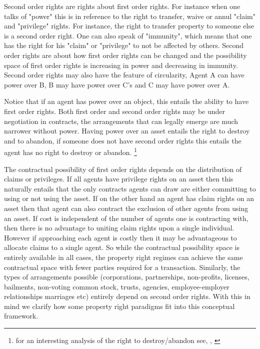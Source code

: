 \documentclass[12pt]{article}
\numberwithin{equation}{section}
\begin{document}
Second order rights are rights about first order rights. For instance when one talks of "power" this is in reference to the right to transfer, waive or annul "claim" and "privilege" rights. For instance, the right to transfer property to someone else is a second order right. One can also speak of "immunity", which means that one has the right for his "claim" or "privilege" to not be affected by others. Second order rights are about how first order rights can be changed and the possibility space of first order rights is increasing in power and decreasing in immunity. Second order rights may also have the feature  of circularity, Agent A can have power over B, B may have power over C's and C may have power over A.

Notice that if an agent has power over an object, this entails the ability to have first order rights. Both first order and second order rights may be under negotiation in contracts, the arrangements that can legally emerge are much narrower without power. Having power over an asset entails the right to destroy and to abandon, if someone does not have second order rights this entails the agent has no right to destroy or abandon. \footnote{for an interesting analysis of the right to destroy/abandon see, \cite{Strahilevitz2005}, \cite{Strahilevitz2009}}

The contractual possibility of first order rights depends on the distribution of claims or privileges. If all agents have privilege rights on an asset then this naturally entails that the only contracts agents can draw are either committing to using or not using the asset. If on the other hand an agent has claim rights on an asset then that agent can also contract the exclusion of other agents from using an asset. If cost is independent of the number of agents one is contracting with, then there is no advantage to uniting claim rights upon a single individual. However if approaching each agent is costly then it may be advantageous to allocate claims to a single agent. So while the contractual possibility space is entirely available in all cases, the property right regimes can achieve the same contractual space with fewer parties  required for a transaction. Similarly, the types of arrangements possible (corporations, partnerships, non-profits, licenses, bailments, non-voting common stock, trusts, agencies, employee-employer relationships marriages etc) entirely depend on second order rights. With this in mind we clarify how some property right paradigms fit into this conceptual framework.
\end{document}
